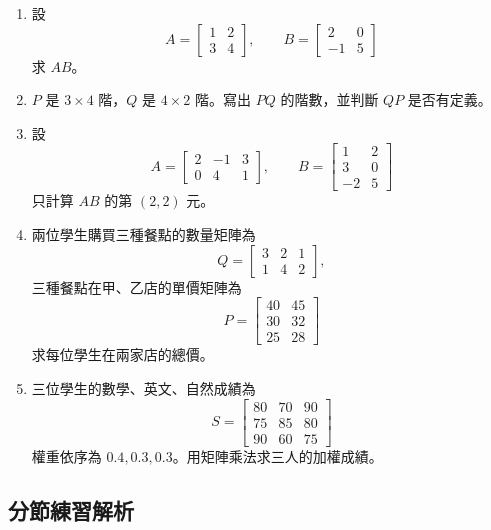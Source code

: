 \documentclass[11pt,a4paper]{article}
\begin{document}
\begin{enumerate}
\def\labelenumi{\arabic{enumi}.}
\item
  設
  \[A=\begin{bmatrix}1&2\\3&4\end{bmatrix},\qquad B=\begin{bmatrix}2&0\\-1&5\end{bmatrix}\]
  求 \(AB\)。
\item
  \(P\) 是 \(3\times4\) 階，\(Q\) 是 \(4\times2\) 階。寫出 \(PQ\) 的階數，並判斷 \(QP\) 是否有定義。
\item
  設
  \[A=\begin{bmatrix}2&-1&3\\0&4&1\end{bmatrix},\qquad
  B=\begin{bmatrix}1&2\\3&0\\-2&5\end{bmatrix}\]
  只計算 \(AB\) 的第 \((2,2)\) 元。
\item
  兩位學生購買三種餐點的數量矩陣為
  \[Q=\begin{bmatrix}3&2&1\\1&4&2\end{bmatrix},\]
  三種餐點在甲、乙店的單價矩陣為
  \[P=\begin{bmatrix}40&45\\30&32\\25&28\end{bmatrix}\]
  求每位學生在兩家店的總價。
\item
  三位學生的數學、英文、自然成績為
  \[S=\begin{bmatrix}80&70&90\\75&85&80\\90&60&75\end{bmatrix}\]
  權重依序為 \(0.4,0.3,0.3\)。用矩陣乘法求三人的加權成績。
\end{enumerate}

\subsection{分節練習解析}\label{ux5206ux7bc0ux7df4ux7fd2ux89e3ux6790-2}
\end{document}

